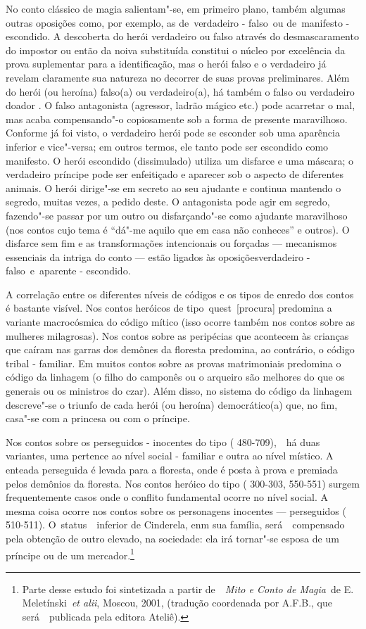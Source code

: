 No conto clássico de magia salientam"-se, em primeiro plano, também
algumas outras oposições como, por exemplo, as de~{verdadeiro -
falso}~ou de~{manifesto - escondido}. A descoberta do herói verdadeiro
ou falso através do desmascaramento do impostor ou então da noiva
substituída constitui o núcleo por excelência da prova suplementar para
a identificação, mas o herói falso e o verdadeiro já revelam claramente
sua natureza no decorrer de suas provas preliminares. Além do herói (ou
heroína) falso(a) ou verdadeiro(a), há também o falso ou verdadeiro
doador . O falso antagonista (agressor, ladrão mágico etc.) pode
acarretar o mal, mas acaba compensando"-o copiosamente sob a forma de
presente maravilhoso. Conforme já foi visto, o verdadeiro herói pode se
esconder sob uma aparência inferior e vice"-versa; em outros termos, ele
tanto pode ser escondido como manifesto. O herói escondido (dissimulado)
utiliza um disfarce e uma máscara; o verdadeiro príncipe pode ser
enfeitiçado e aparecer sob o aspecto de diferentes animais. O herói
dirige"-se em secreto ao seu ajudante e continua mantendo o segredo,
muitas vezes, a pedido deste. O antagonista pode agir em segredo,
fazendo"-se passar por um outro ou disfarçando"-se como ajudante
maravilhoso (nos contos cujo tema é ``dá"-me aquilo que em casa não
conheces'' e outros). O disfarce sem fim e as transformações
intencionais ou forçadas --- mecanismos essenciais da intriga do conto ---
estão ligados às oposições{verdadeiro - falso}~e~{aparente - escondido}.

A correlação entre os diferentes níveis de códigos e os tipos de enredo
dos contos é bastante visível. Nos contos heróicos de
tipo~{quest}~{[}procura{]} predomina a variante macrocósmica do código
mítico (isso ocorre também nos contos sobre as mulheres milagrosas). Nos
contos sobre as peripécias que acontecem às crianças que caíram nas
garras dos demônes da floresta predomina, ao contrário, o código tribal
- familiar. Em muitos contos sobre as provas matrimoniais predomina o
código da linhagem (o filho do camponês ou o arqueiro são melhores do
que os generais ou os ministros do czar). Além disso, no sistema do
código da linhagem descreve"-se o triunfo de cada herói (ou heroína)
democrático(a) que, no fim, casa"-se com a princesa ou com o príncipe.

Nos contos sobre os perseguidos - inocentes do tipo ( 480-709),~~há
duas variantes, uma pertence ao nível social - familiar e outra ao nível
místico. A enteada perseguida é levada para a floresta, onde é posta à
prova e premiada pelos demônios da floresta. Nos contos heróico do tipo
( 300-303, 550-551) surgem frequentemente casos onde o conflito
fundamental ocorre no nível social. A mesma coisa ocorre nos contos
sobre os personagens inocentes --- perseguidos ( 510-511).
O~{status~}~inferior de Cinderela, enm sua família, será~~compensado
pela obtenção de outro elevado, na sociedade: ela irá tornar"-se esposa
de um príncipe ou de um mercador.\footnote{Parte desse estudo foi
  sintetizada a partir de~~\emph{Mito e Conto de Magia}~de E.
  Meletínski~\emph{et alii}, Moscou, 2001, (tradução coordenada por
  A.F.B., que será~~publicada pela editora Ateliê).}

